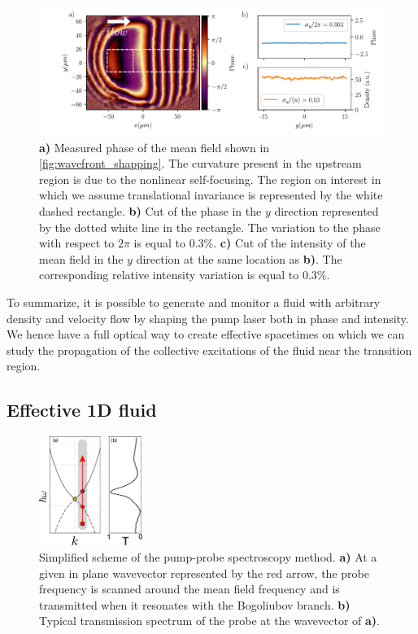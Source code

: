 \begin{figure}[h]
    \centering
    \includegraphics[width=1\textwidth]{chap_custom_st/fig/phase_example.pdf}
    \caption{\textbf{a)} Measured phase of the mean field shown in \autoref{fig:wavefront_shapping}. The curvature present in the upstream region is due to the nonlinear self-focusing. The region
    on interest in which we assume translational invariance is represented by the white dashed rectangle. \textbf{b)}  Cut of the phase in the $y$ direction represented by the dotted white line in the rectangle. The variation to the phase with respect
    to $2\pi$ is equal to 0.3\%. \textbf{c)} Cut of the intensity of the mean field in the $y$ direction at the same location as \textbf{b)}. The corresponding relative intensity variation is equal to 0.3\%.}
    \label{fig:phase_example}
\end{figure}



To summarize, it is possible to generate and monitor a fluid with arbitrary density and velocity flow by shaping the pump laser both in phase and intensity. We hence have a full optical way to create
effective spacetimes on which we can study the propagation of the collective excitations of the fluid near the transition region.

\subsection{Effective 1D fluid}

\begin{figure}[h]
    \centering
    \includegraphics[width=0.3\textwidth]{chap_custom_st/fig/setup_bogoliubov.pdf}
    \caption{Simplified scheme of the pump-probe spectroscopy method. \textbf{a)} At a given in plane wavevector represented by the red arrow, the probe frequency is scanned around the mean field frequency and is transmitted when it resonates with the Bogoliubov branch. \textbf{b)} Typical transmission spectrum of the probe at the wavevector of \textbf{a)}.}
    \label{fig:setup_bogo}
\end{figure}


